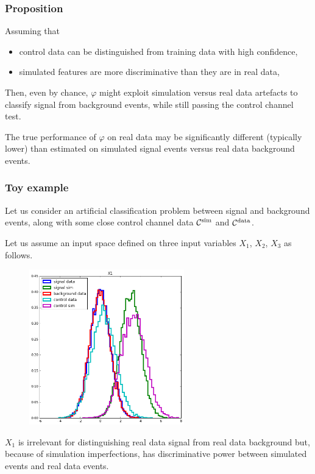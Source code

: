 \documentclass{beamer}
\begin{document}
\begin{frame}
  \frametitle{Proposition}

Assuming that
\begin{itemize}
\item control data can be distinguished from training data with high confidence,
\item simulated features are more discriminative than they are in real data,
\end{itemize}

Then, even by chance, $\varphi$ might exploit simulation versus real data
artefacts to classify signal from background events, {\color{red}while still passing the
control channel test}.

\vspace{1cm}

The true performance of $\varphi$ on real data may be significantly different
(typically lower) than estimated on simulated signal events versus real data
background events.

\end{frame}

\begin{frame}
  \frametitle{Toy example}

Let us consider an artificial classification
problem between signal and background events, along with some close control
channel data ${\cal C}^\text{sim}$ and ${\cal C}^\text{data}$.

\vspace{0.5cm}

Let us assume an
input space defined on three input variables $X_1$, $X_2$, $X_3$ as follows.

\end{frame}

\begin{frame}

\begin{figure}
\centering
\includegraphics[width=0.6\textwidth]{x1.png}
\end{figure}

$X_1$ is irrelevant for distinguishing real data signal from real data
background but, because of simulation imperfections, has discriminative power
between simulated events and real data events.

\end{frame}
\end{document}
